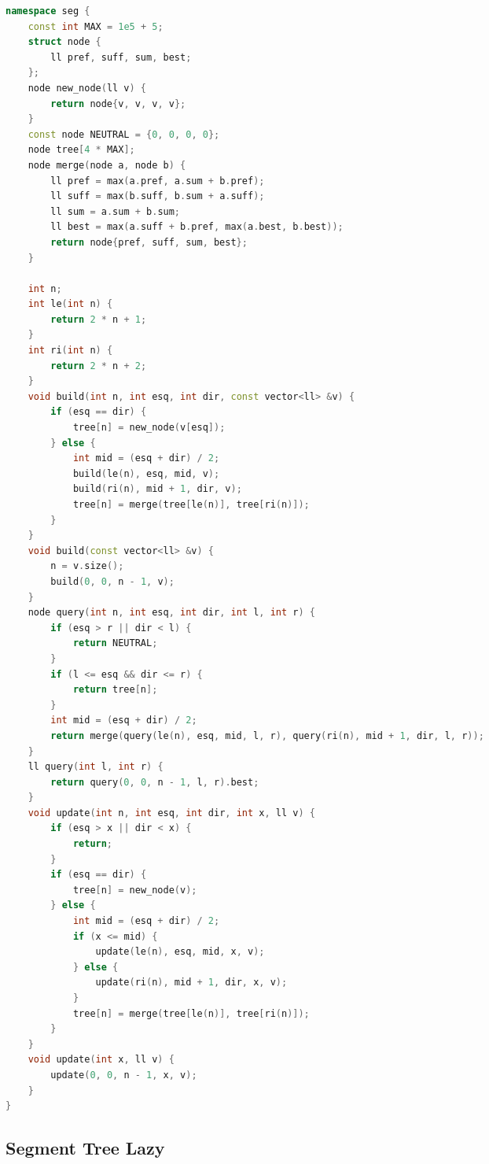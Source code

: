 \documentclass[11pt, a4paper, oneside]{book}
\begin{document}
\begin{multicols}{2}
\begin{lstlisting}[language=C++]
namespace seg {
    const int MAX = 1e5 + 5;
    struct node {
        ll pref, suff, sum, best;
    };
    node new_node(ll v) {
        return node{v, v, v, v};
    }
    const node NEUTRAL = {0, 0, 0, 0};
    node tree[4 * MAX];
    node merge(node a, node b) {
        ll pref = max(a.pref, a.sum + b.pref);
        ll suff = max(b.suff, b.sum + a.suff);
        ll sum = a.sum + b.sum;
        ll best = max(a.suff + b.pref, max(a.best, b.best));
        return node{pref, suff, sum, best};
    }

    int n;
    int le(int n) {
        return 2 * n + 1;
    }
    int ri(int n) {
        return 2 * n + 2;
    }
    void build(int n, int esq, int dir, const vector<ll> &v) {
        if (esq == dir) {
            tree[n] = new_node(v[esq]);
        } else {
            int mid = (esq + dir) / 2;
            build(le(n), esq, mid, v);
            build(ri(n), mid + 1, dir, v);
            tree[n] = merge(tree[le(n)], tree[ri(n)]);
        }
    }
    void build(const vector<ll> &v) {
        n = v.size();
        build(0, 0, n - 1, v);
    }
    node query(int n, int esq, int dir, int l, int r) {
        if (esq > r || dir < l) {
            return NEUTRAL;
        }
        if (l <= esq && dir <= r) {
            return tree[n];
        }
        int mid = (esq + dir) / 2;
        return merge(query(le(n), esq, mid, l, r), query(ri(n), mid + 1, dir, l, r));
    }
    ll query(int l, int r) {
        return query(0, 0, n - 1, l, r).best;
    }
    void update(int n, int esq, int dir, int x, ll v) {
        if (esq > x || dir < x) {
            return;
        }
        if (esq == dir) {
            tree[n] = new_node(v);
        } else {
            int mid = (esq + dir) / 2;
            if (x <= mid) {
                update(le(n), esq, mid, x, v);
            } else {
                update(ri(n), mid + 1, dir, x, v);
            }
            tree[n] = merge(tree[le(n)], tree[ri(n)]);
        }
    }
    void update(int x, ll v) {
        update(0, 0, n - 1, x, v);
    }
}
\end{lstlisting}
\end{multicols}

\hfill

\subsection{Segment Tree Lazy}
\end{document}
